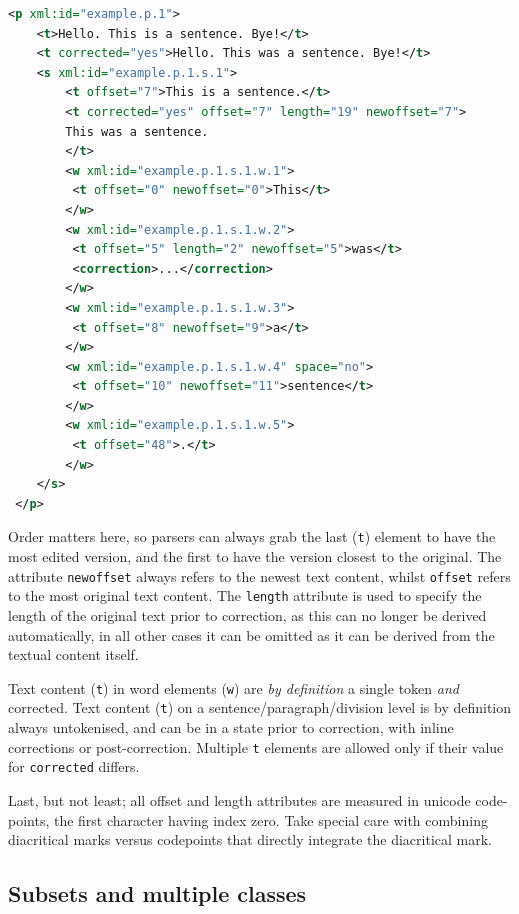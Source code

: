 \documentclass[a4paper,12pt]{report}
\begin{document}
\begin{lstlisting}[language=xml]
 <p xml:id="example.p.1">
    <t>Hello. This is a sentence. Bye!</t>
    <t corrected="yes">Hello. This was a sentence. Bye!</t> 
    <s xml:id="example.p.1.s.1">        
        <t offset="7">This is a sentence.</t>
        <t corrected="yes" offset="7" length="19" newoffset="7">
        This was a sentence.
        </t>        
        <w xml:id="example.p.1.s.1.w.1">
         <t offset="0" newoffset="0">This</t>
        </w>
        <w xml:id="example.p.1.s.1.w.2">
         <t offset="5" length="2" newoffset="5">was</t>
         <correction>...</correction>
        </w>
        <w xml:id="example.p.1.s.1.w.3">
         <t offset="8" newoffset="9">a</t>
        </w>
        <w xml:id="example.p.1.s.1.w.4" space="no">
         <t offset="10" newoffset="11">sentence</t>
        </w>
        <w xml:id="example.p.1.s.1.w.5">
         <t offset="48">.</t>
        </w>
    </s>
 </p>
\end{lstlisting}

    

Order matters here, so parsers can always grab the last (\texttt{t}) element to have the most edited version, and the first to have the version closest to the original. The attribute \texttt{newoffset} always refers to the newest text content, whilst \texttt{offset} refers to the most original text content. The \texttt{length} attribute is used to specify the length of the original text prior to correction, as this can no longer be derived automatically, in all other cases it can be omitted as it can be derived from the textual content itself.

Text content (\texttt{t}) in word elements (\texttt{w}) are \emph{by definition} a single token \emph{and} corrected.  Text content (\texttt{t}) on a sentence/paragraph/division level is by definition always untokenised, and can be in a state prior to correction, with inline corrections or post-correction. Multiple \texttt{t} elements are allowed only if their value for \texttt{corrected} differs.

Last, but not least; all offset and length attributes are measured in unicode code-points, the first character having index zero. Take special care with combining diacritical marks versus codepoints that directly integrate the diacritical mark.

\subsection{Subsets and multiple classes}
\end{document}
